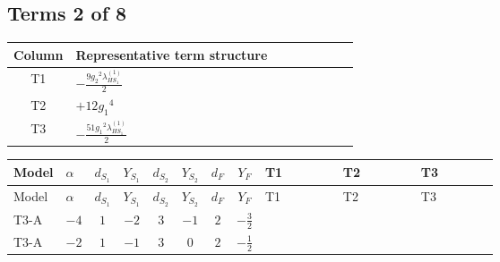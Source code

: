 \documentclass[8pt]{article}
\begin{document}
\begin{landscape}
\subsection*{Terms 2 of 8}
\begin{center}
\begin{tabular}{@{}c >{\raggedright\arraybackslash}p{0.82\linewidth}@{}}
\toprule
Column & Representative term structure \\
\midrule
T1 & \(\displaystyle -\frac{9 {g_2}^2 {\lambda_{HS_1}^{(1)}}}{2}\) \\
\midrule
T2 & \(\displaystyle +12 {g_1}^4\) \\
\midrule
T3 & \(\displaystyle -\frac{51 {g_1}^2 {\lambda_{HS_1}^{(1)}}}{2}\) \\
\midrule
\bottomrule
\end{tabular}
\end{center}
\smallskip
\tiny
\begin{longtable}{@{}llcccccc >{\raggedright\arraybackslash}p{0.21\linewidth} >{\raggedright\arraybackslash}p{0.21\linewidth} >{\raggedright\arraybackslash}p{0.21\linewidth}@{}}
\toprule
Model & $\alpha$ & $d_{S_1}$ & $Y_{S_1}$ & $d_{S_2}$ & $Y_{S_2}$ & $d_F$ & $Y_F$ & T1 & T2 & T3 \\
\midrule
\endfirsthead
\toprule
Model & $\alpha$ & $d_{S_1}$ & $Y_{S_1}$ & $d_{S_2}$ & $Y_{S_2}$ & $d_F$ & $Y_F$ & T1 & T2 & T3 \\
\midrule
\endhead
T3-A & $-4$ & $1$ & $-2$ & $3$ & $-1$ & $2$ & $-\frac{3}{2}$ & \scriptsize\adjustbox{max width=\linewidth}{$\begin{gathered} -\frac{9 {g_2}^2 {\lambda_{HS_1}^{(1)}}}{2}\end{gathered}$} & \scriptsize\adjustbox{max width=\linewidth}{$\begin{gathered} +12 {g_1}^4\end{gathered}$} & \scriptsize\adjustbox{max width=\linewidth}{$\begin{gathered} -\frac{51 {g_1}^2 {\lambda_{HS_1}^{(1)}}}{2}\end{gathered}$} \\
\midrule
T3-A & $-2$ & $1$ & $-1$ & $3$ & $0$ & $2$ & $-\frac{1}{2}$ & \scriptsize\adjustbox{max width=\linewidth}{$\begin{gathered} -\frac{9 {g_2}^2 {\lambda_{HS_1}^{(1)}}}{2}\end{gathered}$} & \scriptsize\adjustbox{max width=\linewidth}{$\begin{gathered} +3 {g_1}^4\end{gathered}$} & \scriptsize\adjustbox{max width=\linewidth}{$\begin{gathered} -\frac{15 {g_1}^2 {\lambda_{HS_1}^{(1)}}}{2}\end{gathered}$} \\

\end{longtable}
\end{landscape}
\end{document}
